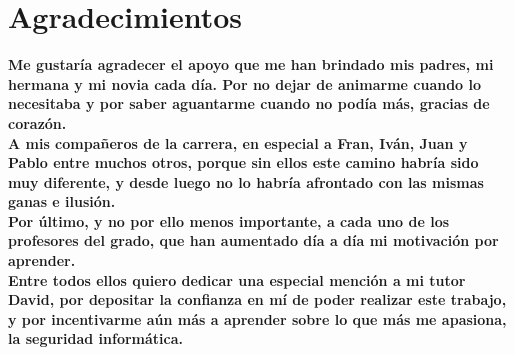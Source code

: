 \chapter*{Agradecimientos}
\textbf{Me gustaría agradecer el apoyo que me han brindado mis padres, mi hermana y mi novia cada día. Por no dejar de animarme cuando lo necesitaba y por saber aguantarme cuando no podía más, gracias de corazón.}\\

\textbf{A mis compañeros de la carrera, en especial a Fran, Iván, Juan y Pablo entre muchos otros, porque sin ellos este camino habría sido muy diferente, y desde luego no lo habría afrontado con las mismas ganas e ilusión.}\\

\textbf{Por último, y no por ello menos importante, a cada uno de los profesores del grado, que han aumentado día a día mi motivación por aprender.} \\

\textbf{Entre todos ellos quiero dedicar una especial mención a mi tutor David, por depositar la confianza en mí de poder realizar este trabajo, y por incentivarme aún más a aprender sobre lo que más me apasiona, la seguridad informática.}